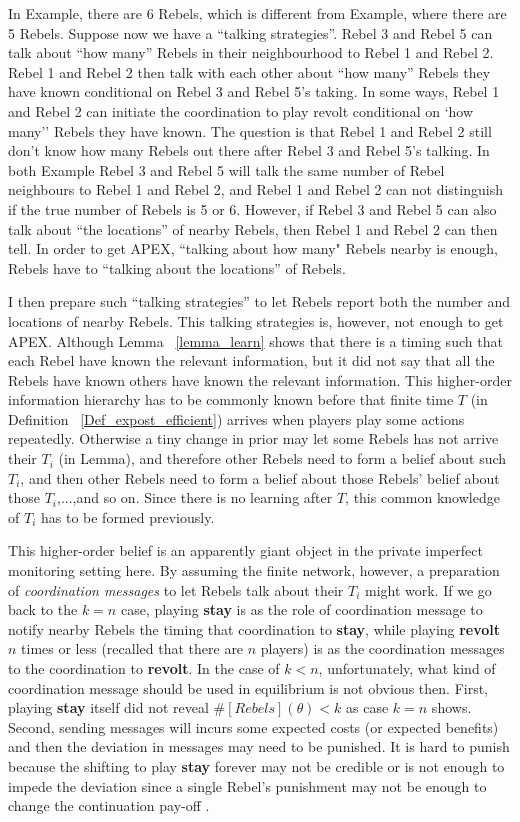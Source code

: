 \documentclass[12pt,letter]{article}
\theoremstyle{definition}
\theoremstyle{remark}
\theoremstyle{claim}
\begin{document}
In Example, there are 6 Rebels, which is different from Example, where there are 5 Rebels. Suppose now we have a ``talking strategies''. Rebel 3 and Rebel 5 can talk about ``how many'' Rebels in their neighbourhood to Rebel 1 and Rebel 2. Rebel 1 and Rebel 2 then talk with each other about ``how many'' Rebels they have known conditional on Rebel 3 and Rebel 5's taking. In some ways, Rebel 1 and Rebel 2 can initiate the coordination to play revolt conditional on `how many'' Rebels they have known. The question is that Rebel 1 and Rebel 2 still don't know how many Rebels out there after Rebel 3 and Rebel 5's talking. In both Example Rebel 3 and Rebel 5 will talk the same number of Rebel neighbours to Rebel 1 and Rebel 2, and Rebel 1 and Rebel 2 can not distinguish if the true number of Rebels is 5 or 6. However, if Rebel 3 and Rebel 5 can also talk about ``the locations'' of nearby Rebels, then Rebel 1 and Rebel 2 can then tell. In order to get APEX, ``talking about how many" Rebels nearby is enough, Rebels have to ``talking about the locations'' of Rebels. 

I then prepare such ``talking strategies'' to let Rebels report both the number and locations of nearby Rebels. This talking strategies is, however, not enough to get APEX. Although Lemma ~\ref{lemma_learn} shows that there is a timing such that each Rebel have known the relevant information, but it did not say that all the Rebels have known others have known the relevant information. This higher-order information hierarchy has to be commonly known before that finite time $T$ (in Definition ~\ref{Def_expost_efficient}) arrives when players play some actions repeatedly. Otherwise a tiny change in prior may let some Rebels has not arrive their $T_i$ (in Lemma), and therefore other Rebels need to form a belief about such $T_i$, and then other Rebels need to form a belief about those Rebels' belief about those $T_i$,...,and so on. Since there is no learning after $T$, this common knowledge of $T_i$ has to be formed previously.

This higher-order belief is an apparently giant object in the private imperfect monitoring setting here. By assuming the finite network, however, a preparation of \textit{coordination messages} to let Rebels talk about their $T_i$ might work. If we go back to the $k=n$ case, playing \textbf{stay} is as the role of coordination message to notify nearby Rebels the timing that coordination to \textbf{stay}, while playing \textbf{revolt} $n$ times or less (recalled that there are $n$ players) is as the coordination messages to the coordination to \textbf{revolt}. In the case of $k<n$, unfortunately, what kind of coordination message should be used in equilibrium is not obvious then. First, playing \textbf{stay} itself did not reveal $\#[Rebels](\theta)<k$ as case $k=n$ shows. Second, sending messages will incurs some expected costs (or expected benefits) and then the deviation in messages may need to be punished. It is hard to punish because the shifting to play \textbf{stay} forever may not be credible or is not enough to impede the deviation since a single Rebel's punishment may not be enough to change the continuation pay-off . 
\end{document}
